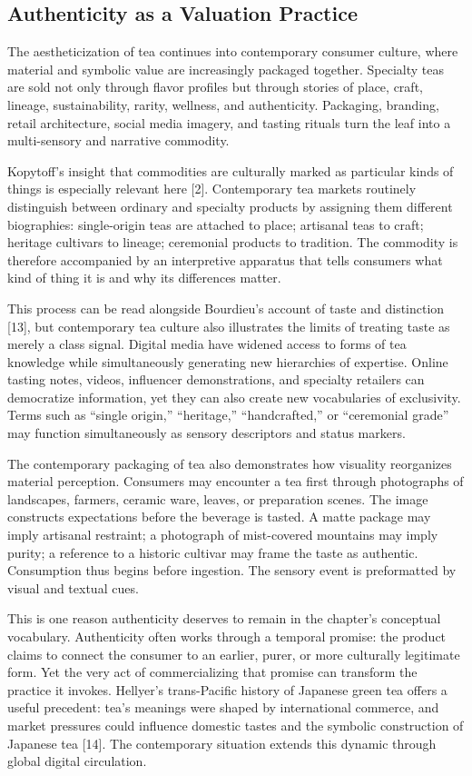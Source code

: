 \documentclass[11pt,a4paper]{article}
\begin{document}
\subsection{Authenticity as a Valuation Practice}

The aestheticization of tea continues into contemporary consumer culture, where material and symbolic value are increasingly packaged together. Specialty teas are sold not only through flavor profiles but through stories of place, craft, lineage, sustainability, rarity, wellness, and authenticity. Packaging, branding, retail architecture, social media imagery, and tasting rituals turn the leaf into a multi-sensory and narrative commodity.

Kopytoff's insight that commodities are culturally marked as particular kinds of things is especially relevant here [2]. Contemporary tea markets routinely distinguish between ordinary and specialty products by assigning them different biographies: single-origin teas are attached to place; artisanal teas to craft; heritage cultivars to lineage; ceremonial products to tradition. The commodity is therefore accompanied by an interpretive apparatus that tells consumers what kind of thing it is and why its differences matter.

This process can be read alongside Bourdieu's account of taste and distinction [13], but contemporary tea culture also illustrates the limits of treating taste as merely a class signal. Digital media have widened access to forms of tea knowledge while simultaneously generating new hierarchies of expertise. Online tasting notes, videos, influencer demonstrations, and specialty retailers can democratize information, yet they can also create new vocabularies of exclusivity. Terms such as ``single origin,'' ``heritage,'' ``handcrafted,'' or ``ceremonial grade'' may function simultaneously as sensory descriptors and status markers.

The contemporary packaging of tea also demonstrates how visuality reorganizes material perception. Consumers may encounter a tea first through photographs of landscapes, farmers, ceramic ware, leaves, or preparation scenes. The image constructs expectations before the beverage is tasted. A matte package may imply artisanal restraint; a photograph of mist-covered mountains may imply purity; a reference to a historic cultivar may frame the taste as authentic. Consumption thus begins before ingestion. The sensory event is preformatted by visual and textual cues.

This is one reason authenticity deserves to remain in the chapter's conceptual vocabulary. Authenticity often works through a temporal promise: the product claims to connect the consumer to an earlier, purer, or more culturally legitimate form. Yet the very act of commercializing that promise can transform the practice it invokes. Hellyer's trans-Pacific history of Japanese green tea offers a useful precedent: tea's meanings were shaped by international commerce, and market pressures could influence domestic tastes and the symbolic construction of Japanese tea [14]. The contemporary situation extends this dynamic through global digital circulation.
\end{document}
